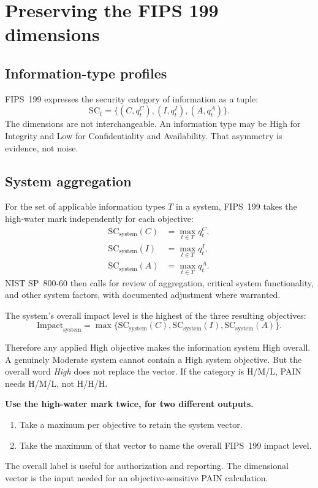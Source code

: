 \documentclass[11pt]{article}
\begin{document}
\section{Preserving the FIPS 199 dimensions}

\subsection{Information-type profiles}

FIPS~199 expresses the security category of information as a tuple:
\[
\mathrm{SC}_{t}
=\{(C,q_t^C),(I,q_t^I),(A,q_t^A)\}.
\]
The dimensions are not interchangeable. An information type may be High for
Integrity and Low for Confidentiality and Availability. That asymmetry is evidence,
not noise.

\subsection{System aggregation}

For the set of applicable information types $T$ in a system, FIPS~199 takes the
high-water mark independently for each objective:
\begin{align}
\mathrm{SC}_{\mathrm{system}}(C)&=\max_{t\in T} q_t^C,\\
\mathrm{SC}_{\mathrm{system}}(I)&=\max_{t\in T} q_t^I,\\
\mathrm{SC}_{\mathrm{system}}(A)&=\max_{t\in T} q_t^A.
\end{align}
NIST SP~800-60 then calls for review of aggregation, critical system functionality,
and other system factors, with documented adjustment where warranted.

The system's overall impact level is the highest of the three resulting objectives:
\[
\mathrm{Impact}_{\mathrm{system}}
=\max\{\mathrm{SC}_{\mathrm{system}}(C),
       \mathrm{SC}_{\mathrm{system}}(I),
       \mathrm{SC}_{\mathrm{system}}(A)\}.
\]

Therefore any applied High objective makes the information system High overall. A
genuinely Moderate system cannot contain a High system objective. But the overall
word \emph{High} does not replace the vector. If the category is H/M/L, PAIN needs
H/M/L, not H/H/H.

\begin{modelbox}
\textbf{Use the high-water mark twice, for two different outputs.}

\begin{enumerate}[leftmargin=1.5em,nosep]
\item Take a maximum per objective to retain the system vector.
\item Take the maximum of that vector to name the overall FIPS~199 impact level.
\end{enumerate}

The overall label is useful for authorization and reporting. The dimensional vector
is the input needed for an objective-sensitive PAIN calculation.
\end{modelbox}
\end{document}
